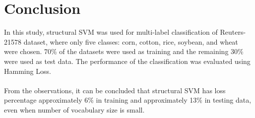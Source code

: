 \section{Conclusion}
In this study, structural SVM was used for multi-label classification of Reuters-21578 dataset, where only five classes: corn, cotton, rice, soybean, and wheat were chosen. 70\% of the datasets were used as training and the remaining 30\% were used as test data. The performance of the classification was evaluated using Hamming Loss.
\\\\
From the observations, it can be concluded that structural SVM has loss percentage approximately 6\% in training and approximately 13\% in testing data, even when number of vocabulary size is small.